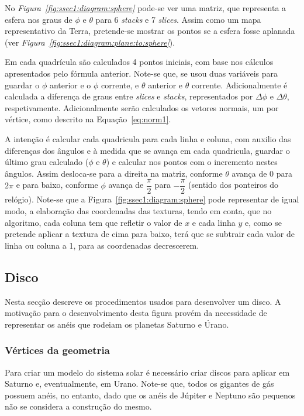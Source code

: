 No \emph{Figura~\ref{fig:ssec1:diagram:sphere}} pode-se ver uma matriz, que
representa a esfera nos graus de $\phi$ e $\theta$ para 6 \emph{stacks}
e 7 \emph{slices}. Assim como um mapa representativo da Terra, pretende-se
mostrar os pontos se a esfera fosse aplanada (ver
\emph{Figura~\ref{fig:ssec1:diagram:plane:to:sphere}}).

Em cada quadrícula são calculados 4 pontos iniciais, com base nos cálculos
apresentados pelo fórmula anterior. Note-se que, se usou duas variáveis para
guardar o $\phi$ anterior e o $\phi$ corrente, e $\theta$ anterior  e $\theta$
corrente. Adicionalmente é calculada a diferença de graus entre \emph{slices}
e \emph{stacks}, representados por $\Delta \phi$ e $\Delta \theta$,
respetivamente. Adicionalmente serão calculados os vetores normais, um por
vértice, como descrito na Equação~\ref{eq:norm1}.

A intenção é calcular cada quadricula para cada linha e coluna, com auxilio das
diferenças dos ângulos e à medida que se avança em cada quadricula, guardar
o último grau calculado ($\phi$ e $\theta$) e calcular nos pontos com
o incremento nestes ângulos. Assim desloca-se para a direita na matriz, conforme
$\theta$ avança de 0 para $2\pi$ e para baixo, conforme $\phi$ avança de
$\dfrac{\pi}{2}$ para $-\dfrac{\pi}{2}$ (sentido dos ponteiros do
relógio). Note-se que a Figura~\ref{fig:ssec1:diagram:sphere} pode representar
de igual modo, a elaboração das coordenadas das texturas, tendo em conta, que no
algoritmo, cada coluna tem que refletir o valor de $x$ e cada linha $y$ e, como
se pretende aplicar a textura de cima para baixo, terá que se subtrair cada
valor de linha ou coluna a 1, para as coordenadas decrescerem.




\newpage


\subsection{Disco}
Nesta secção descreve os procedimentos usados para desenvolver um disco.
A motivação para o desenvolvimento desta figura provém da necessidade de
representar os anéis que rodeiam os planetas Saturno e Úrano.


\subsubsection{Vértices da geometria}

Para criar um modelo do sistema solar é necessário criar discos para aplicar em
Saturno e, eventualmente, em Urano. Note-se que, todos os gigantes de gás
possuem anéis, no entanto, dado que os anéis de Júpiter e Neptuno são pequenos
não se considera a construção do mesmo.

